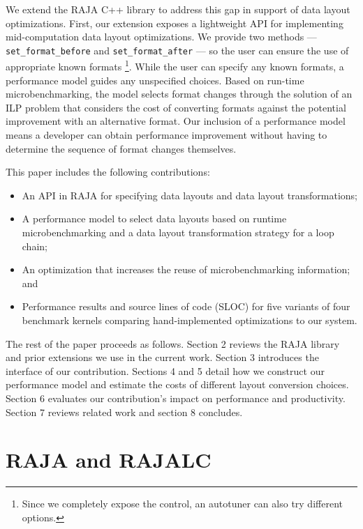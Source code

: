 \documentclass[sigconf,review=true]{acmart}
\begin{document}
We extend the RAJA C++ library to address this gap in support of data layout optimizations.
First, our extension exposes a lightweight API for implementing mid-computation data layout optimizations.
We provide two methods --- \verb.set_format_before. and \verb.set_format_after. --- so the user can ensure the use of appropriate known formats \footnote{Since we completely expose the control, an autotuner can also try different options.}.
While the user can specify any known formats, a performance model guides any unspecified choices.
Based on run-time microbenchmarking, the model selects format changes through the solution of an ILP problem that considers the cost of converting formats against the potential improvement with an alternative format.
Our inclusion of a performance model means a developer can obtain performance improvement without having to determine the sequence of format changes themselves.

This paper includes the following contributions:
\begin{itemize}
\item An API in RAJA for specifying data layouts and data layout transformations;
\item A performance model to select data layouts based on runtime microbenchmarking and a data layout transformation strategy for a loop chain;
\item An optimization that increases the reuse of microbenchmarking information; and
\item Performance results and source lines of code (SLOC) for five variants of four benchmark kernels comparing hand-implemented optimizations to our system.
\end{itemize} 

The rest of the paper proceeds as follows. 
Section 2 reviews the RAJA library and prior extensions we use in the current work.
Section 3 introduces the interface of our contribution.
Sections 4 and 5 detail how we construct our performance model and estimate the costs of different layout conversion choices.
Section 6 evaluates our contribution's impact on performance and productivity.
Section 7 reviews related work and section 8 concludes.


\section{RAJA and RAJALC}
\end{document}
